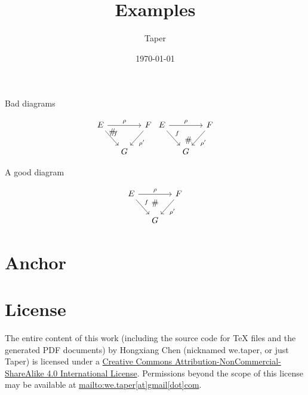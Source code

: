\documentclass{article}
\title{Examples}
\date{\today}
\author{Taper}
\begin{document}
\maketitle
{}
\tableofcontents
\begin{center}
    Bad diagrams
\end{center}
$$
    \begin{tikzcd}[column sep=small]
        E \ar[dr,"f"]\ar[rr,"\rho"]\ar[drr, phantom, "\#", very near
        start] & & F\ar[dl,"\rho'"] \\
        & G &  \,
    \end{tikzcd}
    \begin{tikzcd}[column sep=small]
        E \ar[dr,"f"]\ar[rr,"\rho"]\ar[drr, phantom, "\#"] & & F\ar[dl,"\rho'"] \\
        & G &  \,
    \end{tikzcd}
$$
\begin{center}
    A good diagram
\end{center}
$$
    \begin{tikzcd}[column sep=small]
        E \ar[dr,"f"]\ar[rr,"\rho"] &
        \ar[d,phantom, "\#", near start] & F\ar[dl,"\rho'"] \\
        & G &  \,
    \end{tikzcd}
$$

\section{Anchor}
\label{sec:Anchor}

\begin{thebibliography}{1}
\end{thebibliography}
\printnomenclature
\section{License}
The entire content of this work (including the source code
for TeX files and the generated PDF documents) by 
Hongxiang Chen (nicknamed we.taper, or just Taper) is
licensed under a 
\href{http://creativecommons.org/licenses/by-nc-sa/4.0/}{Creative 
Commons Attribution-NonCommercial-ShareAlike 4.0 International 
License}. Permissions beyond the scope of this 
license may be available at \url{mailto:we.taper[at]gmail[dot]com}.
\end{document}
